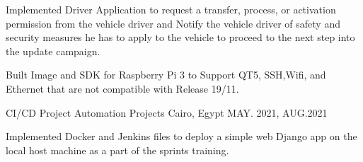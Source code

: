 \begin{cventries}
{\begin{cvitems}
        \item{\normalsize Implemented Driver Application to request a transfer, process, or activation permission from the vehicle driver and Notify the vehicle driver of safety and security measures he has to apply to the vehicle to proceed to the next step into the update campaign.}
        \item{\normalsize Built Image and SDK for Raspberry Pi 3 to Support QT5, SSH,Wifi, and Ethernet that are not compatible with Release 19/11.}
      \end{cvitems}
}
\cventry
{\normalsize CI/CD Project} %
{\Large Automation Projects} %
{\normalsize Cairo, Egypt} %
{\normalsize MAY. 2021, AUG.2021} %
{
      \begin{cvitems} %
        \item {Implemented Docker and Jenkins files to deploy a simple web Django app on the local host machine as a part of the sprints training.}
      \end{cvitems}
}  
\end{cventries}
